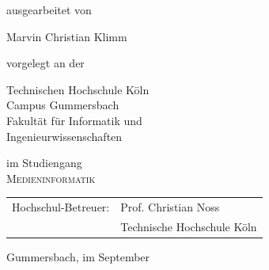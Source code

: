 \begin{titlepage}
\begin{center}
\begin{large}
ausgearbeitet von\\ 
\vspace{0.3cm}
\begin{LARGE}
Marvin Christian Klimm\\
\end{LARGE}
\end{large}

\vspace{1.2cm}

\vspace{0.6cm}

\begin{large}
vorgelegt an der\\ 
\vspace{0.2cm}
\begin{scshape}
Technischen Hochschule Köln\\
Campus Gummersbach\\
Fakultät für Informatik und\\
Ingenieurwissenschaften\\
\end{scshape}
\end{large}

\vspace{0.6cm}

\begin{large}
im Studiengang\\ 
\vspace{0.1cm}
\textsc{Medieninformatik}
\end{large}


\vspace{1.1cm}

\begin{tabular}{rl}
      Hochschul-Betreuer:  &  Prof. Christian Noss\\
       					&  \small Technische Hochschule Köln \\[1.0em]
\end{tabular}

\vspace{0.7cm}

\begin{large}
Gummersbach, im September \the\year
\end{large}

\end{center}

\newpage
\thispagestyle{empty}


\end{titlepage}
